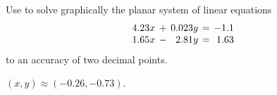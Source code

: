 \documentclass{ximera}
\begin{document}
\begin{exercise} \label{c2.2.2}
Use \Matlab to solve graphically the planar system of linear
equations
\[
\arraycolsep 2pt
\begin{array}{rcrcr}
4.23x & + & 0.023y & = & -1.1 \\
1.65x & - & 2.81y & = &  1.63
\end{array}
\]
to an accuracy of two decimal points.

\begin{solution}

$(x,y) \approx (-0.26,-0.73)$.


\end{solution}
\end{exercise}
\end{document}
